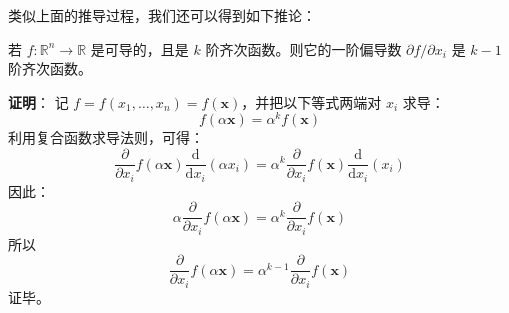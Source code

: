 类似上面的推导过程，我们还可以得到如下推论：
\begin{corollary}{}
若 $f:\mathbb{R}^n \to \mathbb{R}$ 是可导的，且是 $ k $ 阶齐次函数。则它的一阶偏导数 $\partial f/\partial x_i$ 是 $k-1$ 阶齐次函数。
\end{corollary}
\textbf{证明}： 记 $ f=f(x_{1},\ldots ,x_{n})=f(\mathbf {x} )$，并把以下等式两端对 $x_{i}$ 求导：
\begin{equation}
f(\alpha \mathbf {x} )=\alpha ^{k}f(\mathbf {x} )
\end{equation}
利用复合函数求导法则，可得：
\begin{equation}
\frac {\partial }{\partial x_{i}}f(\alpha \mathbf {x} ){\frac {\mathrm {d} }{\mathrm {d} x_{i}}}(\alpha x_{i})=\alpha ^{k}{\frac {\partial }{\partial x_{i}}}f(\mathbf {x} ){\frac {\mathrm {d} }{\mathrm {d} x_{i}}}(x_{i})
\end{equation}
因此：
\begin{equation}
\alpha {\frac {\partial }{\partial x_{i}}}f(\alpha \mathbf {x} )=\alpha ^{k}{\frac {\partial }{\partial x_{i}}}f(\mathbf {x} )
\end{equation}
所以
\begin{equation}
{\frac {\partial }{\partial x_{i}}}f(\alpha \mathbf {x} )=\alpha ^{k-1}{\frac {\partial }{\partial x_{i}}}f(\mathbf {x} )
\end{equation}
证毕。

